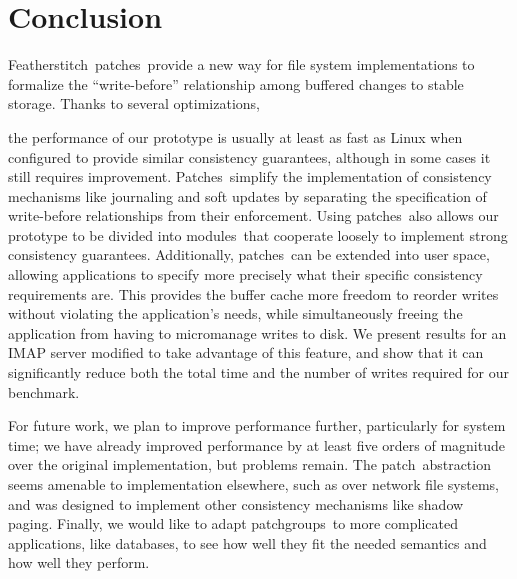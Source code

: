 \documentclass[9pt,twocolumn,letterpaper]{article}
\newcommand{\Kudos}{Featherstitch}
\newcommand{\patch}{patch}
\newcommand{\patches}{patches}
\newcommand{\Patches}{Patches}
\newcommand{\modules}{modules}
\newcommand{\patchgroups}{patchgroups}
\begin{document}
\section{Conclusion}
\label{sec:conclusion}

\Kudos\ \patches\ provide a new way for file system implementations to formalize
the ``write-before'' relationship among buffered changes to stable storage.
%
Thanks to several optimizations,
\begin{comment}
which significantly decrease the overhead
required to use \patches, both in terms of the amount of memory required and the
CPU time spent.
%
We evaluate a prototype file system implementation using \patches\ to determine
whether these ideas can be used in production file systems.
%
\end{comment}
the
performance of our prototype is usually at least as fast as Linux when
configured to provide similar consistency guarantees, although in some cases it
still requires improvement.
%
\Patches\ simplify the implementation of consistency mechanisms like journaling
and soft updates by separating the specification of write-before
relationships from their enforcement.
%
Using \patches\ also allows our prototype to be divided into \modules\ that
cooperate loosely to implement strong consistency guarantees.
%
Additionally, \patches\ can be extended into user space, allowing applications to
specify more precisely what their specific consistency requirements are.
%
This provides the buffer cache more freedom to reorder writes without violating
the application's needs, while simultaneously freeing the application from
having to micromanage writes to disk.
%
We present results for an IMAP server modified to take advantage of this
feature, and show that it can significantly reduce both the total time and the
number of writes required for our benchmark.


For future work, we plan to improve performance further, particularly for
system time; %
%
we have already improved performance by at least five orders of magnitude
over the original implementation, but problems remain.
%
The \patch\ abstraction seems amenable to implementation elsewhere,
such as over network file systems, and was designed to implement other consistency
mechanisms like shadow paging.
%
Finally, we would like to adapt \patchgroups\ to more complicated
applications, like databases, to see how well they fit the needed semantics and
how well they perform.
\end{document}
